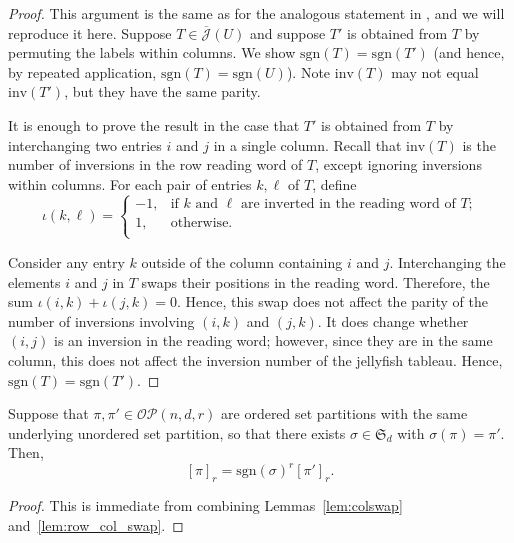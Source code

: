 \documentclass[ALCO, Unicode]{cedram}
\numberwithin{equation}{section}
\newcommand{\rstabgen}{\overline{\mathcal{J}}}
\newcommand{\inv}{\mathrm{inv}}
\newcommand{\sgn}{\mathrm{sgn}}
\newcommand{\ordsetpart}{\mathcal{OP}}
\begin{document}
\begin{proof} 
This argument is the same as for the analogous statement in \cite[Lemma~3.9]{Patrias.Pechenik.Striker}, and we will reproduce it here.
Suppose $T\in \rstabgen(U)$ and suppose $T'$ is obtained from $T$ by permuting the labels within columns.
We show $\sgn(T)=\sgn(T')$ (and hence, by repeated application, $\sgn(T) = \sgn(U)$). Note $\inv(T)$ may not equal $\inv(T')$, but they have the same parity.

It is enough to prove the result in the case that $T'$ is obtained from $T$ by interchanging two entries $i$ and $j$ in a single column.
Recall that $\inv(T)$ is the number of inversions in the row reading word of $T$, except ignoring inversions within columns. For each pair of entries $k,\ell$ of $T$, define
\[
\iota(k,\ell) = \begin{cases}
-1, & \text{if $k$ and $\ell$ are inverted in the reading word of $T$;} \\
1, & \text{otherwise.}\\
\end{cases}
\]

Consider any entry $k$ outside of the column containing $i$ and $j$.
Interchanging the elements $i$ and $j$ in $T$ swaps their
positions in the reading word. Therefore, the sum $\iota(i,k) + \iota(j,k) = 0$. Hence, this swap does not affect the parity of the number of inversions involving $(i, k)$ and $(j, k)$.
It does change whether $(i, j)$ is an inversion in the reading word; however, since they are in the same column, this does not affect the inversion number of the jellyfish tableau. Hence, $\sgn(T) = \sgn(T')$.
\end{proof}

\begin{corollary}
    Suppose that $\pi, \pi' \in \ordsetpart(n,d,r)$ are ordered set partitions with the same underlying unordered set partition, so that there exists $\sigma\in\mathfrak{S}_d$ with $\sigma(\pi)=\pi'$. Then, 
    \[
    [\pi]_r = \sgn(\sigma)^r [\pi']_r.
    \]
\end{corollary}
\begin{proof}
    This is immediate from combining Lemmas~\ref{lem:colswap} and~\ref{lem:row_col_swap}.
\end{proof}
\end{document}
